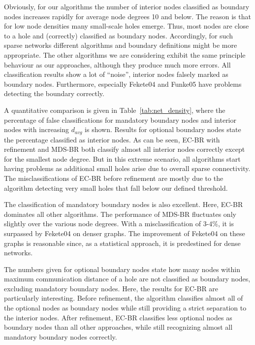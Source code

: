 \documentclass{llncs}
\begin{document}
Obviously, for our algorithms the number of interior nodes classified as boundary nodes increases rapidly for average node degrees 10 and below.
The reason is that for low node densities many small-scale holes emerge.
Thus, most nodes are close to a hole and (correctly) classified as boundary nodes.
Accordingly, for such sparse networks different algorithms and boundary definitions might be more appropriate.
The other algorithms we are considering exhibit the same principle behaviour as our approaches, although they produce much more errors.
All classification results show a lot of ``noise'', interior nodes falsely marked as boundary nodes.
Furthermore, especially Fekete04 and Funke05 have problems detecting the boundary correctly.

A quantitative comparison is given in Table~\ref{tab:net_density}, where the percentage of false classifications for mandatory boundary nodes and interior nodes with increasing $d_{avg}$ is shown.
Results for optional boundary nodes state the percentage classified as interior nodes.
As can be seen, EC-BR with refinement and MDS-BR both classify almost all interior nodes correctly except for the smallest node degree.
But in this extreme scenario, all algorithms start having problems as additional small holes arise due to overall sparse connectivity.
The misclassifications of EC-BR before refinement are mostly due to the algorithm detecting very small holes that fall below our defined threshold.

The classification of mandatory boundary nodes is also excellent.
Here, EC-BR dominates all other algorithms.
The performance of MDS-BR fluctuates only slightly over the various node degrees.
With a misclassification of $3$-$4\%$, it is surpassed by Fekete04 on denser graphs.
The improvement of Fekete04 on these graphs is reasonable since, as a statistical approach, it is predestined for dense networks.

The numbers given for optional boundary nodes state how many nodes within maximum communication distance of a hole are not classified as boundary nodes, excluding mandatory boundary nodes.
Here, the results for EC-BR are particularly interesting.
Before refinement, the algorithm classifies almost all of the optional nodes as boundary nodes while still providing a strict separation to the interior nodes.
After refinement, EC-BR classifies less optional nodes as boundary nodes than all other approaches, while still recognizing almost all mandatory boundary nodes correctly.
\end{document}
